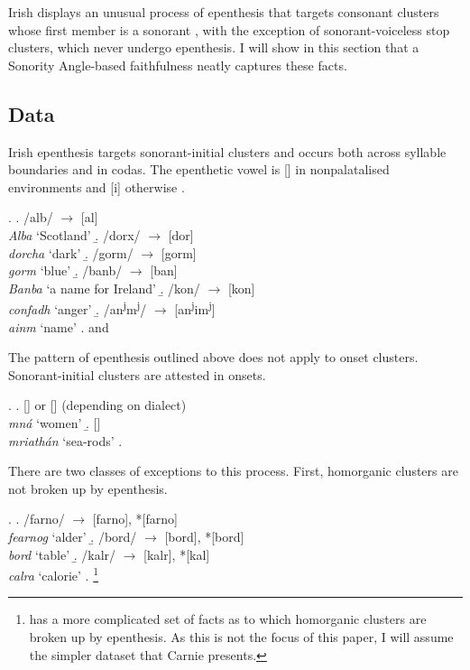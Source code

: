 \documentclass[12pt]{article}
\begin{document}
Irish displays an unusual process of epenthesis that targets consonant clusters 
whose first member is a sonorant \citep{carnie.1994, ni.chiosain.1999}, with the 
exception of sonorant-voiceless stop clusters, which never undergo epenthesis. 
I will show in this section that a {\sc Sonority Angle}-based faithfulness
neatly captures these facts.

\subsection{Data}

Irish epenthesis targets sonorant-initial clusters and occurs both across syllable boundaries and in codas.  The epenthetic vowel is [] in nonpalatalised environments and [i] otherwise \citep{ni.chiosain.1999}.

\ex. \a. /alb/ $\rightarrow$ [al] \\
         {\it Alba} `Scotland'
     \b. /dorx/ $\rightarrow$ [dor] \\
         {\it dorcha} `dark'
     \b. /gorm/  $\rightarrow$  [gorm] \\
         {\it gorm} `blue'
     \b. /banb/ $\rightarrow$ [ban] \\
         {\it Banba} `a name for Ireland'
     \b. /kon/ $\rightarrow$ [kon] \\
         {\it confadh} `anger'
     \b. /an\textsuperscript{j}m\textsuperscript{j}/ $\rightarrow$ [an\textsuperscript{j}im\textsuperscript{j}] \\
         {\it ainm} `name'
     \z.
     \citep[(37)]{carnie.1994} and \citep[(2)]{ni.chiosain.1999}

The pattern of epenthesis outlined above does not apply to onset clusters.  Sonorant-initial clusters
are attested in onsets.

\ex. \a. [] or [] (depending on dialect) \\
         {\it mn\'a} `women'
     \b. [] \\
         {\it mriath\'an} `sea-rods'
     \z.
     \citep[456]{swingle.1992}

There are two classes of exceptions to this process.  First, homorganic clusters are not broken up by epenthesis.

\ex. \a. /farno/ $\rightarrow$ [farno], *[farno] \\
         {\it fearnog} `alder'
     \b. /bord/ $\rightarrow$ [bord], *[bord] \\
         {\it bord} `table'
     \b. /kalr/ $\rightarrow$ [kalr], *[kal] \\
         {\it calra} `calorie'  
     \z. 
     \citep[(52)]{carnie.1994}\footnote{\citet{ni.chiosain.1999} has a more complicated set of facts as to which homorganic clusters are broken up by epenthesis. As this is not the focus of this paper, I will assume the simpler dataset that Carnie presents.}
\end{document}

